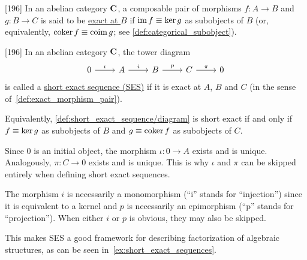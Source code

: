 \begin{definition}\label{def:exact_morphism_pair}\cite{MacLane1994}[196]
  In an abelian category $\operatorname{\mathbf{C}}$, a composable pair of morphisms $f: A \to B$ and $g: B \to C$ is said to be \ul{exact at $B$} if $\operatorname{im} f \equiv \operatorname{ker} g$ as subobjects of $B$ (or, equivalently, $\operatorname{coker} f \equiv \operatorname{coim} g$; see \cref{def:categorical_subobject}).
\end{definition}

\begin{definition}\label{def:short_exact_sequence}\cite{MacLane1994}[196]
  In an abelian category $\operatorname{\mathbf{C}}$, the tower diagram
  \begin{equation}\label{def:short_exact_sequence/diagram}
    \begin{tikzcd}[baseline=(current bounding box.center)]
      0 \arrow[r, "\iota"] & A \arrow[r, "i"] & B \arrow[r, "p"] & C \arrow[r, "\pi"] & 0
    \end{tikzcd}
  \end{equation}
  is called a \ul{short exact sequence (SES)} if it is exact at $A$, $B$ and $C$ (in the sense of~\cref{def:exact_morphism_pair}).

  Equivalently, \cref{def:short_exact_sequence/diagram} is short exact if and only if $f \equiv \operatorname{ker} g$ as subobjects of $B$ and $g \equiv \operatorname{coker} f$ as subobjects of $C$.
\end{definition}

\begin{note}\label{note:short_exact_sequence_factorization}
  Since $0$ is an initial object, the morphism $\iota: 0 \to A$ exists and is unique. Analogously, $\pi: C \to 0$ exists and is unique. This is why $\iota$ and $\pi$ can be skipped entirely when defining short exact sequences.

  The morphism $i$ is necessarily a monomorphism (\enquote{i} stands for \enquote{injection}) since it is equivalent to a kernel and $p$ is necessarily an epimorphism (\enquote{p} stands for \enquote{projection}). When either $i$ or $p$ is obvious, they may also be skipped.

  This makes SES a good framework for describing factorization of algebraic structures, as can be seen in~\cref{ex:short_exact_sequences}.
\end{note}

